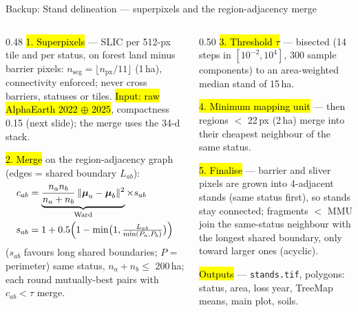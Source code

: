 \begin{frame}{Backup: Stand delineation — superpixels and the region-adjacency merge}
\footnotesize
\begin{columns}[T]
\begin{column}{0.48\textwidth}
\hl{1. Superpixels} — SLIC per 512-px tile and per status, on forest land minus barrier pixels: $n_{\text{seg}} = \lfloor n_{\text{px}}/11\rfloor$ (1\,ha), connectivity enforced; never cross barriers, statuses or tiles. \hl{Input: raw AlphaEarth 2022 $\oplus$ 2025}, compactness 0.15 (next slide); the merge uses the 34-d stack.

\medskip
\hl{2. Merge} on the region-adjacency graph (edges = shared boundary $L_{ab}$):
\begin{align*}
c_{ab} &= \underbrace{\frac{n_an_b}{n_a+n_b}\,\lVert\boldsymbol\mu_a-\boldsymbol\mu_b\rVert^2}_{\text{Ward}}\times s_{ab}\\
s_{ab} &= 1+0.5\Bigl(1-\min\bigl(1,\tfrac{L_{ab}}{\min(P_a,P_b)}\bigr)\Bigr)
\end{align*}
($s_{ab}$ favours long shared boundaries; $P$ = perimeter)
same status, $n_a+n_b\le$ 200\,ha; each round mutually-best pairs with $c_{ab}<\tau$ merge.
\end{column}
\begin{column}{0.50\textwidth}
\hl{3. Threshold $\tau$} — bisected (14 steps in $[10^{-2},10^{4}]$, 300 sample components) to an area-weighted median stand of 15\,ha.

\medskip
\hl{4. Minimum mapping unit} — then regions $<$ 22\,px (2\,ha) merge into their cheapest neighbour of the same status.

\medskip
\hl{5. Finalise} — barrier and sliver pixels are grown into 4-adjacent stands (same status first), so stands stay connected; fragments $<$ MMU join the same-status neighbour with the longest shared boundary, only toward larger ones (acyclic).

\medskip
\hl{Outputs} — \texttt{stands.tif}, polygons: status, area, loss year, TreeMap means, main plot, soils.
\end{column}
\end{columns}
\end{frame}

